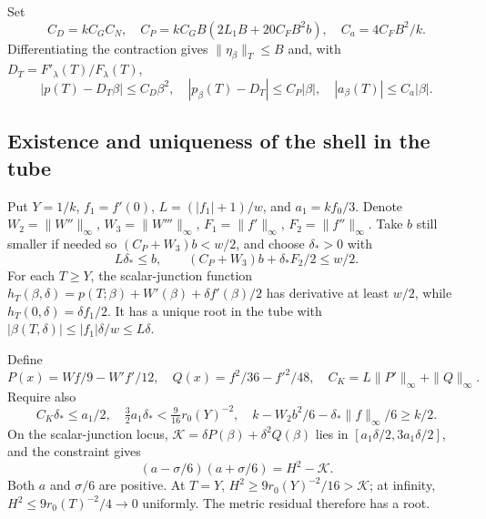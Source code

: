 \documentclass[11pt]{article}
\begin{document}
Set
\begin{equation}
C_D=kC_GC_N,\quad C_P=kC_GB(2L_1B+20C_FB^2b),\quad C_a=4C_FB^2/k.
\end{equation}
Differentiating the contraction gives $\|\eta_\beta\|_T\le B$ and, with $D_T=F'_\lambda(T)/F_\lambda(T)$,
\begin{equation}
|p(T)-D_T\beta|\le C_D\beta^2,\quad
|p_\beta(T)-D_T|\le C_P|\beta|,\quad
|a_\beta(T)|\le C_a|\beta|.\label{eq:endpointbounds}
\end{equation}

\subsection{Existence and uniqueness of the shell in the tube}
Put $Y=1/k$, $f_1=f'(0)$, $L=(|f_1|+1)/w$, and $a_1=kf_0/3$. Denote $W_2=\|W''\|_\infty$, $W_3=\|W'''\|_\infty$, $F_1=\|f'\|_\infty$, $F_2=\|f''\|_\infty$. Take $b$ still smaller if needed so $(C_P+W_3)b<w/2$, and choose $\delta_*>0$ with
\begin{equation}
L\delta_*\le b,\qquad (C_P+W_3)b+\delta_*F_2/2\le w/2.\label{eq:scalarconditions}
\end{equation}
For each $T\ge Y$, the scalar-junction function
$h_T(\beta,\delta)=p(T;\beta)+W'(\beta)+\delta f'(\beta)/2$
has derivative at least $w/2$, while $h_T(0,\delta)=\delta f_1/2$. It has a unique root in the tube with $|\beta(T,\delta)|\le |f_1|\delta/w\le L\delta$.

Define
\begin{equation}
P(x)=Wf/9-W'f'/12,\quad Q(x)=f^2/36-f'^2/48,\quad
C_K=L\|P'\|_\infty+\|Q\|_\infty.
\end{equation}
Require also
\begin{equation}
C_K\delta_*\le a_1/2,\quad
\tfrac32a_1\delta_*<\tfrac9{16}r_0(Y)^{-2},\quad
k-W_2b^2/6-\delta_*\|f\|_\infty/6\ge k/2.
\label{eq:metricconditions}
\end{equation}
On the scalar-junction locus, $\mathcal K=\delta P(\beta)+\delta^2Q(\beta)$ lies in $[a_1\delta/2,3a_1\delta/2]$, and the constraint gives
\begin{equation}
(a-\sigma/6)(a+\sigma/6)=H^2-\mathcal K.
\end{equation}
Both $a$ and $\sigma/6$ are positive. At $T=Y$, $H^2\ge9r_0(Y)^{-2}/16>\mathcal K$; at infinity, $H^2\le9r_0(T)^{-2}/4\to0$ uniformly. The metric residual therefore has a root.
\end{document}
